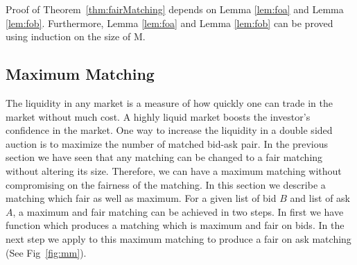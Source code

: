 \documentclass[a4paper,UKenglish,cleveref, autoref]{lipics-v2019}
\begin{document}
\begin{theorem}\label{thm:fairMatching}
\end{theorem}

Proof of Theorem~\ref{thm:fairMatching} depends on Lemma \ref{lem:foa} and Lemma \ref{lem:fob}. Furthermore, Lemma \ref{lem:foa} and Lemma \ref{lem:fob} can be proved using induction on the size of M. 

\subsection{Maximum Matching}

The liquidity in any market is a measure of how quickly one can trade in the market without much cost. A highly liquid market boosts the investor's confidence in the market. One way to increase the liquidity in a double sided auction is to maximize the number of matched bid-ask pair. In the previous section we have seen that any matching can be changed to a fair matching without altering its size. Therefore, we can have a maximum matching without compromising on the fairness of the matching. In this section we describe a matching which fair as well as maximum. For a given list of bid $B$ and list of ask $A$, a maximum and fair matching can be achieved in two steps. In first we have function  which produces a matching which is maximum and fair on bids. In the next step we apply  to this maximum matching to produce a fair on ask matching (See Fig~\ref{fig:mm}).
\end{document}
